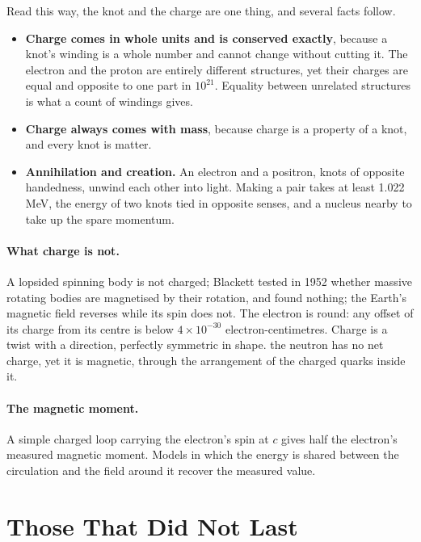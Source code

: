 \documentclass[11pt,a4paper]{article}
\begin{document}
Read this way, the knot and the charge are one thing, and several facts follow.
\begin{itemize}
\item \textbf{Charge comes in whole units and is conserved exactly}, because a knot's winding is a whole number and cannot change without cutting it. The electron and the proton are entirely different structures, yet their charges are equal and opposite to one part in $10^{21}$. Equality between unrelated structures is what a count of windings gives.
\item \textbf{Charge always comes with mass}, because charge is a property of a knot, and every knot is matter.
\item \textbf{Annihilation and creation.} An electron and a positron, knots of opposite handedness, unwind each other into light. Making a pair takes at least 1.022 MeV, the energy of two knots tied in opposite senses, and a nucleus nearby to take up the spare momentum.
\end{itemize}

\paragraph{What charge is not.}  A lopsided spinning body is not charged; Blackett tested in 1952 whether massive rotating bodies are magnetised by their rotation, and found nothing; the Earth's magnetic field reverses while its spin does not. The electron is round: any offset of its charge from its centre is below $4\times10^{-30}$ electron-centimetres. Charge is a twist with a direction, perfectly symmetric in shape.  the neutron has no net charge, yet it is magnetic, through the arrangement of the charged quarks inside it.

\paragraph{The magnetic moment.} A simple charged loop carrying the electron's spin at $c$ gives half the electron's measured magnetic moment. Models in which the energy is shared between the circulation and the field around it recover the measured value. 

\section{Those That Did Not Last}
\label{sec:lost}
\end{document}
